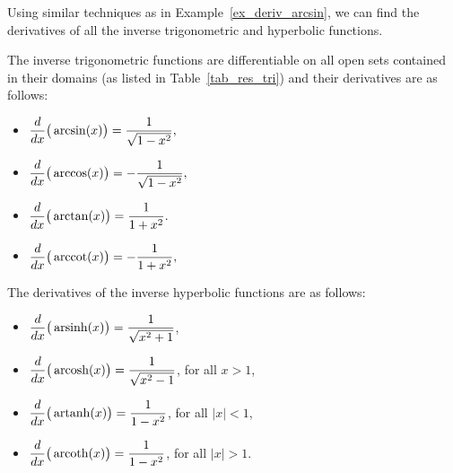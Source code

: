 Using similar techniques as in Example~\ref{ex_deriv_arcsin}, we can find the derivatives of all the inverse trigonometric \ifcourse \ifanalysis  and hyperbolic functions.  \fi \fi

The inverse trigonometric functions are differentiable on all open sets contained in their domains (as listed in Table~\ref{tab_res_tri}) and their derivatives are as follows:

	\begin{minipage}{.5\textwidth}
	\begin{itemize}
	\item		$\displaystyle \frac{d}{dx}\big(\arcsin (x) \big) = \frac{1}{\sqrt{1-x^2}},$ 
	\item		$\displaystyle \frac{d}{dx}\big(\arccos (x) \big) = -\frac{1}{\sqrt{1-x^2}},$ 
	\end{itemize}
	\end{minipage}
	\begin{minipage}{.5\textwidth}
	\begin{itemize}
	\item		$\displaystyle \frac{d}{dx}\big(\arctan (x) \big) = \frac{1}{1+x^2}.$
	\item		$\displaystyle \frac{d}{dx}\big(\operatorname{arccot} (x) \big) = -\frac{1}{1+x^2},$
	\end{itemize}
	\normalsize
	\end{minipage}

\ifcourse	
\ifanalysis

The derivatives of the inverse hyperbolic functions are as follows:

\begin{minipage}{.5\textwidth}
\begin{itemize}
\item $\displaystyle \frac{d}{dx}\big(\operatorname{arsinh}(x)\big)=\frac {1}{\sqrt {x^{2}+1}}$,
\item $\displaystyle \frac{d}{dx}\big(\operatorname{arcosh}(x)\big)=\frac {1}{\sqrt {x^{2}-1}}$, for all $x>1$,
\end{itemize}
\end{minipage}
\begin{minipage}{.5\textwidth}
\begin{itemize}
\item $\displaystyle \frac{d}{dx}\big(\operatorname{artanh}(x)\big)=\frac {1}{1-x^{2}}$,  for all $|x|<1$,
\item $\displaystyle \frac{d}{dx}\big(\operatorname{arcoth}(x)\big)=\frac {1}{1-x^{2}}$,  for all $|x|>1$.
\end{itemize}
\end{minipage}

